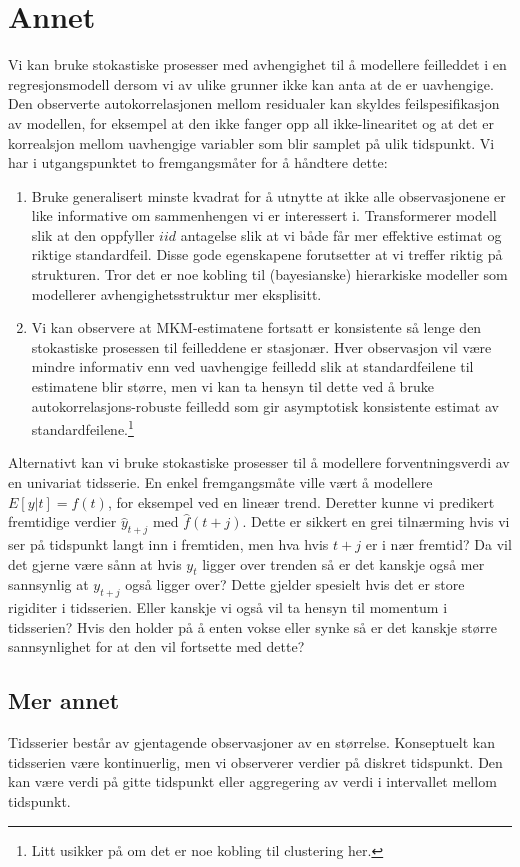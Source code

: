 \section{Annet}
Vi kan bruke stokastiske prosesser med avhengighet til å modellere feilleddet i en regresjonsmodell dersom vi av ulike grunner ikke kan anta at de er uavhengige. Den observerte autokorrelasjonen mellom residualer kan skyldes feilspesifikasjon av modellen, for eksempel at den ikke fanger opp all ikke-linearitet og at det er korrealsjon mellom uavhengige variabler som blir samplet på ulik tidspunkt. Vi har i utgangspunktet to fremgangsmåter for å håndtere dette:
\begin{enumerate}
\item Bruke generalisert minste kvadrat for å utnytte at ikke alle observasjonene er like informative om sammenhengen vi er interessert i. Transformerer modell slik at den oppfyller $iid$ antagelse slik at vi både får mer effektive estimat og riktige standardfeil. Disse gode egenskapene forutsetter at vi treffer riktig på strukturen. Tror det er noe kobling til (bayesianske) hierarkiske modeller som modellerer avhengighetsstruktur mer eksplisitt.
\item Vi kan observere at MKM-estimatene fortsatt er konsistente så lenge den stokastiske prosessen til feilleddene er stasjonær. Hver observasjon vil være mindre informativ enn ved uavhengige feilledd slik at standardfeilene til estimatene blir større, men vi kan ta hensyn til dette ved å bruke autokorrelasjons-robuste feilledd som gir asymptotisk konsistente estimat av standardfeilene.\footnote{Litt usikker på om det er noe kobling til clustering her.}
\end{enumerate}
Alternativt kan vi bruke stokastiske prosesser til å modellere forventningsverdi av en univariat tidsserie. En enkel fremgangsmåte ville vært å modellere $E[y|t] = f(t)$, for eksempel ved en lineær trend. Deretter kunne vi predikert fremtidige verdier $\hat{y}_{t+j}$ med $\hat{f}(t+j)$. Dette er sikkert en grei tilnærming hvis vi ser på tidspunkt langt inn i fremtiden, men hva hvis $t+j$ er i nær fremtid? Da vil det gjerne være sånn at hvis $y_t$ ligger over trenden så er det kanskje også mer sannsynlig at $y_{t+j}$ også ligger over? Dette gjelder spesielt hvis det er store rigiditer i tidsserien. Eller kanskje vi også vil ta hensyn til momentum i tidsserien? Hvis den holder på å enten vokse eller synke så er det kanskje større sannsynlighet for at den vil fortsette med dette?
\subsection{Mer annet}
Tidsserier består av gjentagende observasjoner av en størrelse. Konseptuelt kan tidsserien være kontinuerlig, men vi observerer verdier på diskret tidspunkt. Den kan være verdi på gitte tidspunkt eller aggregering av verdi i intervallet mellom tidspunkt.